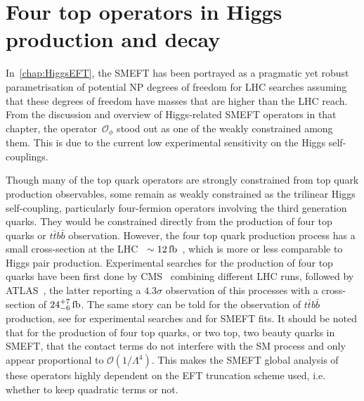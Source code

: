 

\chapter{ Four top operators in Higgs production and decay}\label{chap:4topSingleHiggs}
%
\par In~\autoref{chap:HiggsEFT}, the SMEFT has been portrayed as a pragmatic yet robust parametrisation of potential NP degrees of freedom for LHC searches assuming that these degrees of freedom have masses that are higher than the LHC reach. From the discussion and overview of Higgs-related SMEFT operators in that chapter, the operator~$ \mathcal O _{\phi}$ stood out as one of the weakly constrained among them. This is due to the current low experimental sensitivity on the Higgs self-couplings.
\par 
Though many of the top quark operators are strongly constrained from top quark production observables, some remain as weakly constrained as the trilinear Higgs self-coupling, particularly four-fermion operators involving the third generation quarks. They would be constrained directly from the production of four top quarks or $t \bar t b \bar b$ observation. However,  the four top quark production process has a small cross-section at the LHC~ $\sim12\, \femtobarn$~\cite{Frederix:2017wme}, which is more or less comparable to Higgs pair production. Experimental searches for the production of four top quarks have been first done by CMS~\cite{Sirunyan:2019nxl} combining different LHC runs, followed by ATLAS~\cite{Aad:2020klt}, the latter reporting a $4.3 \sigma$ observation of this processes with a cross-section of $24^{+7}_{-6}\,\femtobarn$. The same story can be told for the observation of $t\bar{t}b\bar{b}$ production, see \cite{Sirunyan:2020kgar, ATLAS:2018gug} for experimental searches and \cite{DHondt:2018cww, Hartland:2019bjb} for SMEFT fits. It should be noted that for the production of four top quarks, or two top, two beauty quarks in SMEFT, that the contact terms do not interfere with the SM process and only appear proportional to $\mathcal{O}(1/\Lambda^4)$. This makes the SMEFT global analysis of these operators highly dependent on the EFT truncation scheme used, i.e. whether to keep quadratic terms or not. 
